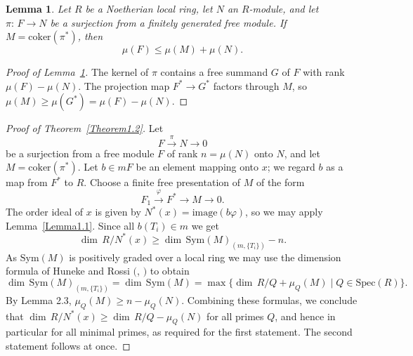 \documentclass{proc-l}
\newcommand{\coker}{\mathrm{coker}}
\newcommand{\Sym}{\mathrm{ Sym}}
\newcommand{\Spec}{\mathrm{ Spec}}
\newcommand{\image}{\mathrm{ image}}
\newtheorem{Lemma}[Theorem]{Lemma}
\theoremstyle{remark}
\theoremstyle{definition}
\begin{document}
\begin{Lemma}\label{Lemma1.3}  
Let $R$ be a  Noetherian local ring, let $N$ an
$R$-module, and let $\pi:\, F\longrightarrow N$ be a surjection from a finitely
generated free module. If $M = \coker(\pi^*)$, then
\begin{equation*}
\mu(F) \leq \mu(M)+\mu(N).
\end{equation*} 
\end{Lemma}

\begin{proof}[Proof of Lemma~\ref{Lemma1.3}]
The kernel of $\pi$ contains a free
summand $G$ of $F$ with rank $\mu(F)-\mu(N)$. The projection map
$F^*\longrightarrow G^*$ factors through $M$, so 
$\mu(M)\geq \mu(G^*) = \mu(F)-\mu(N)$.
\end{proof}


\begin{proof}[Proof of Theorem~\ref{Theorem1.2}]
 Let
\begin{equation*}
F \stackrel{\pi}{\longrightarrow} N \rightarrow 0
\end{equation*} 
be a surjection from a free module
$F$ of rank $n = \mu(N)$ onto $N$, and let $M=\coker(\pi^*)$.  Let
$b\in mF$ be an element mapping onto $x$; we regard $b$ as a map from
$F^*$ to $R$. Choose a finite free presentation of $M$ of the form
\begin{equation*} 
F_1\stackrel{\varphi}{\longrightarrow} F^*\longrightarrow  M \rightarrow 0.
\end{equation*} 
The order ideal of $x$ is given by
$N^*(x) = \image (b\varphi)$, so we may apply Lemma~\ref{Lemma1.1}.  Since all
$b(T_i)\in m$ we get
\begin{equation*} 
\dim \, R/N^*(x) \geq \dim \, \Sym(M)_{(m,\{T_i\})}-n.
\end{equation*} 
As $\Sym(M)$ is positively graded over a local ring 
 we may use the dimension formula of Huneke
and Rossi $($\cite[Theorem~2.6]{HR}, \cite[Theorem~1.2.1]{V}$)$ 
to obtain
\vspace{-1pc}
\begin{equation*} 
\dim \, \Sym(M)_{(m,\{T_i\})} = \dim \, \Sym(M) = \max\{
\dim \, R/Q +\mu_Q(M)
\mid Q\in \Spec(R) \}.
\end{equation*} 
By Lemma 2.3, $\mu_Q(M) \geq n-\mu_Q(N)$. Combining these formulas, we
conclude that
$\dim \, R/N^*(x) \geq \dim \, R/Q-\mu_Q(N)$ for all primes $Q$, and
hence in particular for all minimal primes, as required for the first
statement.  The second statement  follows at once.
\end{proof}
\end{document}
